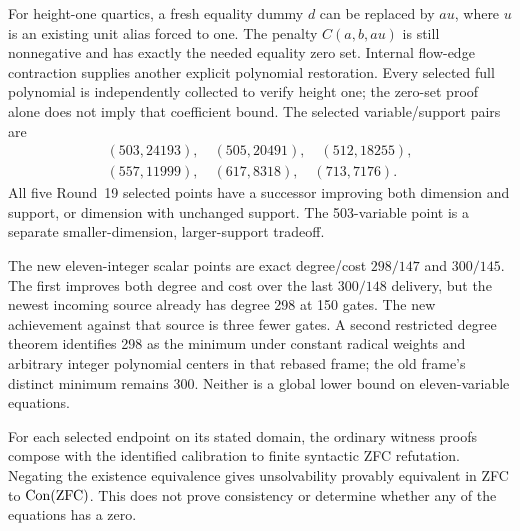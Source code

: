 For height-one quartics, a fresh equality dummy $d$ can be replaced by
$a u$, where $u$ is an existing unit alias forced to one. The penalty
$C(a,b,au)$ is still nonnegative and has exactly the needed equality
zero set. Internal flow-edge contraction supplies another explicit
polynomial restoration. Every selected full polynomial is independently
collected to verify height one; the zero-set proof alone does not imply
that coefficient bound. The selected variable/support pairs are
\[
 \begin{gathered}
 (503,24193),\quad(505,20491),\quad(512,18255),\\
 (557,11999),\quad(617,8318),\quad(713,7176).
 \end{gathered}
\]
All five Round~19 selected points have a successor improving both dimension
and support, or dimension with unchanged support. The 503-variable point
is a separate smaller-dimension, larger-support tradeoff.

The new eleven-integer scalar points are exact degree/cost $298/147$
and $300/145$. The first improves both degree and cost over the last
$300/148$ delivery, but the newest incoming source already has degree
298 at 150 gates. The new achievement against that source is three fewer
gates. A second restricted degree theorem identifies 298 as the minimum
under constant radical weights and arbitrary integer polynomial centers
in that rebased frame; the old frame's distinct minimum remains 300.
Neither is a global lower bound on eleven-variable equations.

For each selected endpoint on its stated domain, the ordinary witness
proofs compose with the identified calibration to finite syntactic ZFC
refutation. Negating the existence equivalence gives unsolvability
provably equivalent in ZFC to $\operatorname{Con}(\mathrm{ZFC})$. This does not
prove consistency or determine whether any of the equations has a zero.
